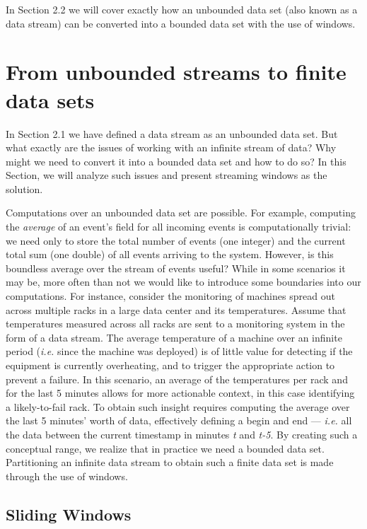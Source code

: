 In Section 2.2 we will cover exactly how an unbounded data set (also known as a data stream) can be converted into a bounded data set with the use of windows.

\section{From unbounded streams to finite data sets} \label{sec:windows}

In Section 2.1 we have defined a data stream as an unbounded data set. But what exactly are the issues of working with an infinite stream of data? Why might we need to convert it into a bounded data set and how to do so? In this Section, we will analyze such issues and present streaming windows as the solution.

Computations over an unbounded data set are possible. For example, computing the \textit{average} of an event's field for all incoming events is computationally trivial: we need only to store the total number of events (one integer) and the current total sum (one double) of all events arriving to the system. However, is this boundless average over the stream of events useful? While in some scenarios it may be, more often than not we would like to introduce some boundaries into our computations. For instance, consider the monitoring of machines spread out across multiple racks in a large data center and its temperatures. Assume that temperatures measured across all racks are sent to a monitoring system in the form of a data stream. The average temperature of a machine over an infinite period (\textit{i.e.} since the machine was deployed) is of little value for detecting if the equipment is currently overheating, and to trigger the appropriate action to prevent a failure. In this scenario, an average of the temperatures per rack and for the last 5 minutes allows for more actionable context, in this case identifying a likely-to-fail rack. To obtain such insight requires computing the average over the last 5 minutes' worth of data, effectively defining a begin and end --- \textit{i.e.} all the data between the current timestamp in minutes \textit{t} and \textit{t-5}. By creating such a conceptual range, we realize that in practice we need a bounded data set. Partitioning an infinite data stream to obtain such a finite data set is made through the use of windows.

\subsection{Sliding Windows}

